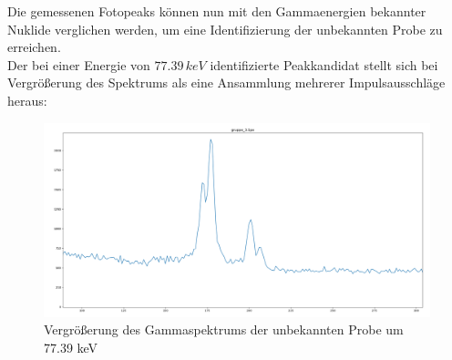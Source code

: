 \documentclass[12pt,german]{article}
\begin{document}
    Die gemessenen Fotopeaks können nun mit den Gammaenergien bekannter Nuklide verglichen werden, um eine Identifizierung der unbekannten Probe zu erreichen. \\
    Der bei einer Energie von \(77.39\, keV\) identifizierte Peakkandidat stellt sich bei Vergrößerung des Spektrums als eine Ansammlung mehrerer Impulsausschläge heraus: \\
    
    \begin{figure}[H]
        \centering
        \includegraphics[width=1.0\textwidth]{pics/gruppe_3_xrays.png}
        \caption{Vergrößerung des Gammaspektrums der unbekannten Probe um 77.39 keV}
    \end{figure}
\end{document}
